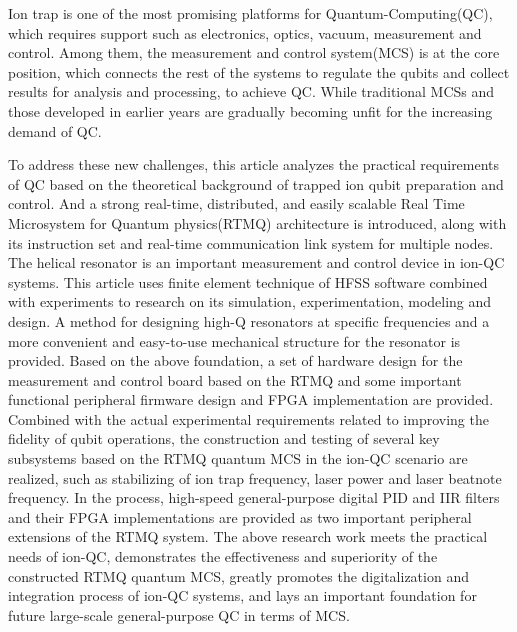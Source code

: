 \begin{abstract*}
  Ion trap is one of the most promising platforms for Quantum-Computing(QC), which requires support such as electronics, optics, vacuum, measurement and control. 
  Among them, the measurement and control system(MCS) is at the core position, which connects the rest of the systems to regulate the qubits and collect results for analysis and processing, to achieve QC. 
  While traditional MCSs and those developed in earlier years are gradually becoming unfit for the increasing demand of QC.
 
  To address these new challenges, this article analyzes the practical requirements of QC based on the theoretical background of trapped ion qubit preparation and control. 
  And a strong real-time, distributed, and easily scalable Real Time Microsystem for Quantum physics(RTMQ) architecture is introduced, along with its instruction set and real-time communication link system for multiple nodes. 
  The helical resonator is an important measurement and control device in ion-QC systems. This article uses finite element technique of HFSS software combined with experiments to research on its simulation, experimentation, modeling and design. A method for designing high-Q resonators at specific frequencies and a more convenient and easy-to-use mechanical structure for the resonator is provided. 
  Based on the above foundation, a set of hardware design for the measurement and control board based on the RTMQ and some important functional peripheral firmware design and FPGA implementation are provided. 
  Combined with the actual experimental requirements related to improving the fidelity of qubit operations, the construction and testing of several key subsystems based on the RTMQ quantum MCS in the ion-QC scenario are realized, such as stabilizing of ion trap frequency, laser power and laser beatnote frequency. 
  In the process, high-speed general-purpose digital PID and IIR filters and their FPGA implementations are provided as two important peripheral extensions of the RTMQ system. 
  The above research work meets the practical needs of ion-QC, demonstrates the effectiveness and superiority of the constructed RTMQ quantum MCS, greatly promotes the digitalization and integration process of ion-QC systems, and lays an important foundation for future large-scale general-purpose QC in terms of MCS.


\end{abstract*}
